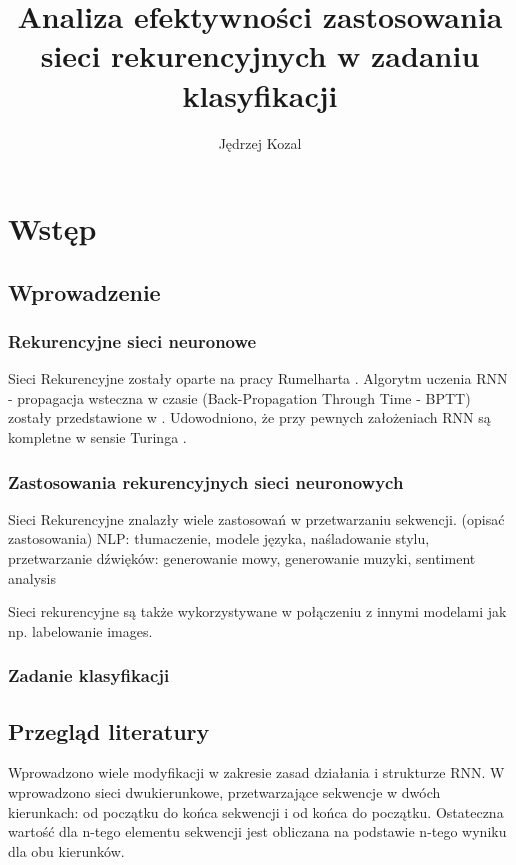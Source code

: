 \documentclass[oneside, mag]{mgr}
\title{Analiza efektywności zastosowania sieci rekurencyjnych w zadaniu klasyfikacji}
\author{Jędrzej Kozal}
\begin{document}
	

\maketitle

\chapter{Wstęp}

\section{Wprowadzenie}

\subsection{Rekurencyjne sieci neuronowe}

Sieci Rekurencyjne zostały oparte na pracy Rumelharta \cite{RNN}. Algorytm uczenia RNN - propagacja wsteczna w czasie (Back-Propagation Through Time - BPTT) zostały przedstawione w \cite{BPTT}.
Udowodniono, że przy pewnych założeniach RNN są kompletne w sensie Turinga \cite{turing-complete}.

\subsection{Zastosowania rekurencyjnych sieci neuronowych}

Sieci Rekurencyjne znalazły wiele zastosowań w przetwarzaniu sekwencji. (opisać zastosowania) NLP: tłumaczenie, modele języka, naśladowanie stylu, przetwarzanie dźwięków: generowanie mowy, generowanie muzyki, sentiment analysis 

Sieci rekurencyjne są także wykorzystywane w połączeniu z innymi modelami jak np. labelowanie images.

\subsection{Zadanie klasyfikacji}

\cite{Goodfellow-et-al-2016}

\section{Przegląd literatury}

Wprowadzono wiele modyfikacji w zakresie zasad działania i strukturze RNN. 
W \cite{bidirectional} wprowadzono sieci dwukierunkowe, przetwarzające sekwencje w dwóch kierunkach: od początku do końca sekwencji i od końca do początku. Ostateczna wartość dla n-tego elementu sekwencji jest obliczana na podstawie n-tego wyniku dla obu kierunków.
\end{document}
